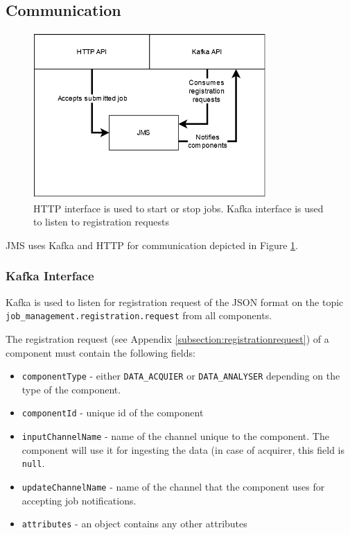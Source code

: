 \subsection{Communication}\label{subsection:jms_communication}
\begin{figure}[H]
    \centering
    \includegraphics[width=0.8\textwidth]{diagrams/api-jms.png}
    \caption{HTTP interface is used to start or stop jobs. Kafka interface is used to listen to registration requests}
    \label{fig:apiJms}
\end{figure}
JMS uses Kafka and HTTP for communication depicted in Figure \ref{fig:apiJms}.



\subsubsection{Kafka Interface}\label{subsubsection:jms_kafkainterface}

Kafka is used to listen for registration request of the JSON format on the topic \texttt{job\_management.registration.request} from all components. 

The registration request (see Appendix \ref{subsection:registrationrequest}) of a component must contain the following fields:

\begin{itemize}
    \item \texttt{componentType} - either \texttt{DATA\_ACQUIER} or \texttt{DATA\_ANALYSER} depending on the type of the component.
    \item \texttt{componentId} - unique id of the component
    \item \texttt{inputChannelName} - name of the channel unique to the component. The component will use it for ingesting the data (in case of acquirer, this field is \texttt{null}.
    \item \texttt{updateChannelName} - name of the channel that the component uses for accepting job notifications.
    \item \texttt{attributes} - an object contains any other attributes
\end{itemize}


